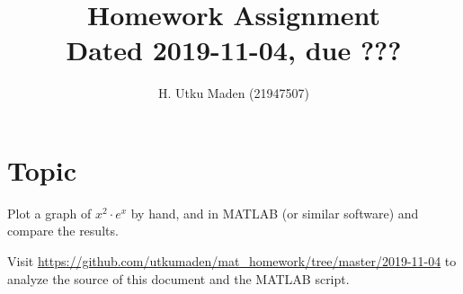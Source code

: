\documentclass[a4paper]{article}
\title{
Homework Assignment\\
{\small Dated 2019-11-04, due ???}
}
\author{H. Utku Maden (21947507)}
\begin{document}
    
\maketitle

\section{Topic}

Plot a graph of \(x^2\cdot e^x\) by hand, and in MATLAB (or similar software)
and compare the results.





{\small
\vspace{10mm}
Visit 
\url{https://github.com/utkumaden/mat_homework/tree/master/2019-11-04} to
analyze the source of this document and the MATLAB script.
}
\end{document}
